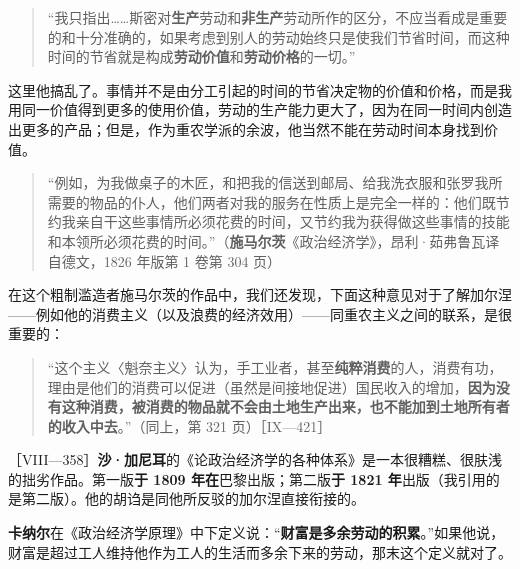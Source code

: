 \begin{quote}“我只指出……斯密对\textbf{生产}劳动和\textbf{非生产}劳动所作的区分，不应当看成是重要的和十分准确的，如果考虑到别人的劳动始终只是使我们节省时间，而这种时间的节省就是构成\textbf{劳动价值}和\textbf{劳动价格}的一切。”\end{quote}

\fontbox{~\{}这里他搞乱了。事情并不是由分工引起的时间的节省决定物的价值和价格，而是我用同一价值得到更多的使用价值，劳动的生产能力更大了，因为在同一时间内创造出更多的产品；但是，作为重农学派的余波，他当然不能在劳动时间本身找到价值。\fontbox{\}~}

\begin{quote}“例如，为我做桌子的木匠，和把我的信送到邮局、给我洗衣服和张罗我所需要的物品的仆人，他们两者对我的服务在性质上是完全一样的：他们既节约我亲自干这些事情所必须花费的时间，又节约我为获得做这些事情的技能和本领所必须花费的时间。”（\textbf{施马尔茨}《政治经济学》，昂利·茹弗鲁瓦译自德文，1826 年版第 1 卷第 304 页）\end{quote}

在这个粗制滥造者施马尔茨的作品中，我们还发现，下面这种意见对于了解加尔涅——例如他的消费主义（以及浪费的经济效用）——同重农主义之间的联系，是很重要的：

\begin{quote}“这个主义〈魁奈主义〉认为，手工业者，甚至\textbf{纯粹消费}的人，消费有功，理由是他们的消费可以促进（虽然是间接地促进）国民收入的增加，\textbf{因为没有这种消费，被消费的物品就不会由土地生产出来，也不能加到土地所有者的收入中去}。”（同上，第 321 页）［IX—421］\end{quote}


［VIII—358］\textbf{沙·加尼耳}的《论政治经济学的各种体系》是一本很糟糕、很肤浅的拙劣作品。第一版\textbf{于 1809 年在}巴黎出版；第二版\textbf{于 1821 年}出版（我引用的是第二版）。他的胡诌是同他所反驳的加尔涅直接衔接的。

\fontbox{~\{}\textbf{卡纳尔}在《政治经济学原理》中下定义说：“\textbf{财富是多余劳动的积累}。”如果他说，财富是超过工人维持他作为工人的生活而多余下来的劳动，那末这个定义就对了。\fontbox{\}~}

